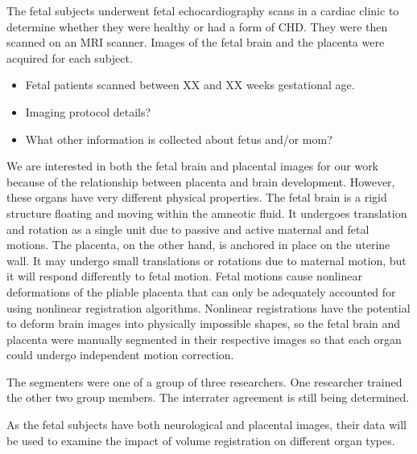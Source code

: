 The fetal subjects underwent fetal echocardiography scans in a cardiac clinic to determine whether they were healthy or had a form of CHD. They were then scanned on an MRI scanner. Images of the fetal brain and the placenta were acquired for each subject.

\begin{itemize}
\item Fetal patients scanned between XX and XX weeks gestational age. 
\item Imaging protocol details?
\item What other information is collected about fetus and/or mom?
\end{itemize} 

We are interested in both the fetal brain and placental images for our work because of the relationship between placenta and brain development. However, these organs have very different physical properties. The fetal brain is a rigid structure floating and moving within the amneotic fluid. It undergoes translation and rotation as a single unit due to passive and active maternal and fetal motions. The placenta, on the other hand, is anchored in place on the uterine wall. It may undergo small translations or rotations due to maternal motion, but it will respond differently to fetal motion. Fetal motions cause nonlinear deformations of the pliable placenta that can only be adequately accounted for using nonlinear registration algorithms. Nonlinear registrations have the potential to deform brain images into physically impossible shapes, so the fetal brain and placenta were manually segmented in their respective images so that each organ could undergo independent motion correction. 

The segmenters were one of a group of three researchers. One researcher trained the other two group members. The interrater agreement is still being determined. %

As the fetal subjects have both neurological and placental images, their data will be used to examine the impact of volume registration on different organ types.



